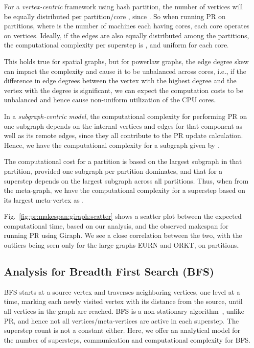\documentclass[10pt,conference, compsocconf]{IEEEtran}
\begin{document}
For a \emph{vertex-centric} framework using hash partition, the number of vertices  will be equally distributed per partition/core , since . So when running PR on  partitions, where  is the number of machines each having  cores, each core operates on  vertices. Ideally, if the edges are also equally distributed among the partitions, the computational complexity per superstep is  , and uniform for each core. 

This holds true for spatial graphs, but for powerlaw graphs, the edge degree skew can impact the complexity and cause it to be unbalanced across cores, i.e., if the difference in edge degrees between the vertex with the highest degree and the vertex with the  degree is significant, we can expect the computation costs to be unbalanced and hence cause non-uniform utilization of the CPU cores.




In a \emph{subgraph-centric model}, the computational complexity for performing PR on one subgraph depends on the internal vertices and edges for that component as well as its remote edges, since they all contribute to the PR update calculation. Hence, we have the computational complexity for a subgraph  given by .

The computational cost for a partition is based on the largest subgraph in that partition, provided one subgraph per partition dominates, and that for a superstep depends on the largest subgraph across all partitions. Thus, when from the meta-graph, we have the computational complexity for a superstep based on its largest meta-vertex as   .

Fig.~\ref{fig:pr:makespan:giraph:scatter} shows a scatter plot between the expected computational time, based on our analysis, and the observed makespan for running PR using Giraph. We see a close correlation between the two, with the outliers being seen only for the large graphs EURN and ORKT, on  partitions.












\subsection{Analysis for Breadth First Search (BFS)}
\label{sec-ana-bfs}
BFS starts at a source vertex and traverses neighboring vertices, one level at a time, marking each newly visited vertex with its distance from the source, until all vertices in the graph are reached. BFS is a non-stationary algorithm~\cite{mizan}, unlike PR, and hence not all vertices/meta-vertices are active in each superstep. The superstep count is not a constant either. Here, we offer an analytical model for the number of supersteps, communication and computational complexity for BFS.
\end{document}
